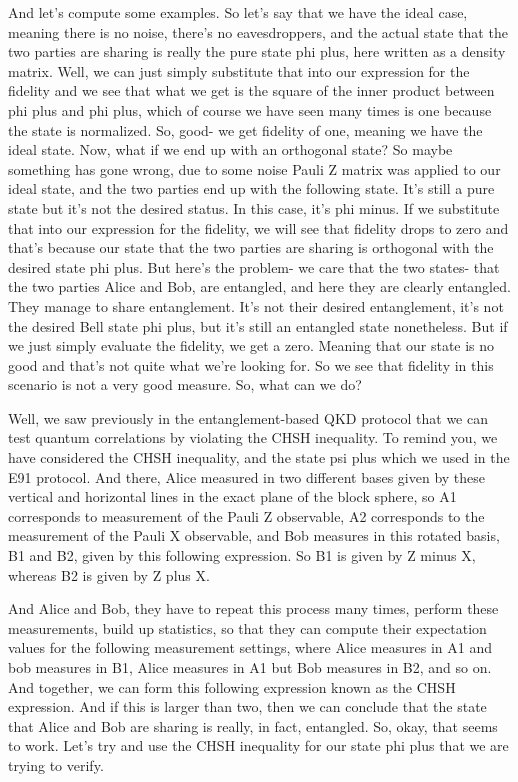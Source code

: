 And let's compute some examples. So let's say that we have the ideal case, meaning there is no noise, there's no eavesdroppers, and the actual state that the two parties are sharing is really the pure state phi plus, here written as a density matrix. Well, we can just simply substitute that into our expression for the fidelity and we see that what we get is the square of the inner product between phi plus and phi plus, which of course we have seen many times is one because the state is normalized. So, good- we get fidelity of one, meaning we have the ideal state. Now, what if we end up with an orthogonal state? So maybe something has gone wrong, due to some noise Pauli Z matrix was applied to our ideal state, and the two parties end up with the following state. It's still a pure state but it's not the desired status. In this case, it's phi minus. If we substitute that into our expression for the fidelity, we will see that fidelity drops to zero and that's because our state that the two parties are sharing is orthogonal with the desired state phi plus. But here's the problem- we care that the two states- that the two parties Alice and Bob, are entangled, and here they are clearly entangled. They manage to share entanglement. It's not their desired entanglement, it's not the desired Bell state phi plus, but it's still an entangled state nonetheless. But if we just simply evaluate the fidelity, we get a zero. Meaning that our state is no good and that's not quite what we're looking for. So we see that fidelity in this scenario is not a very good measure. So, what can we do?

Well, we saw previously in the entanglement-based QKD protocol that we can test quantum correlations by violating the CHSH inequality. To remind you, we have considered the CHSH inequality, and the state psi plus which we used in the E91 protocol. And there, Alice measured in two different bases given by these vertical and horizontal lines in the exact plane of the block sphere, so A1 corresponds to measurement of the Pauli Z observable, A2 corresponds to the measurement of the Pauli X observable, and Bob measures in this rotated basis, B1 and B2, given by this following expression. So B1 is given by Z minus X, whereas B2 is given by Z plus X.

And Alice and Bob, they have to repeat this process many times, perform these measurements, build up statistics, so that they can compute their expectation values for the following measurement settings, where Alice measures in A1 and bob measures in B1, Alice measures in A1 but Bob measures in B2, and so on. And together, we can form this following expression known as the CHSH expression. And if this is larger than two, then we can conclude that the state that Alice and Bob are sharing is really, in fact, entangled. So, okay, that seems to work. Let's try and use the CHSH inequality for our state phi plus that we are trying to verify.

